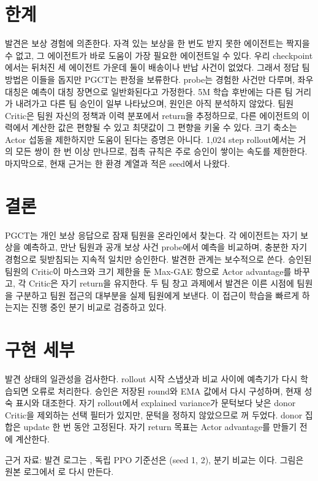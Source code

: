 \documentclass[10pt,twocolumn,letterpaper]{article}
\begin{document}
\section{한계}
발견은 보상 경험에 의존한다. 자격 있는 보상을 한 번도 받지 못한 에이전트는 짝지을 수 없고, 그 에이전트가 바로 도움이 가장 필요한 에이전트일 수 있다. 우리 checkpoint에서는 뒤처진 세 에이전트 가운데 둘이 배송이나 반납 사건이 없었다. 그래서 정답 팀 방법은 이들을 돕지만 PGCT는 판정을 보류한다. probe는 경험한 사건만 다루며, 좌우 대칭은 예측이 대칭 장면으로 일반화된다고 가정한다. 5M 학습 후반에는 다른 팀 거리가 내려가고 다른 팀 승인이 일부 나타났으며, 원인은 아직 분석하지 않았다. 팀원 Critic은 팀원 자신의 정책과 이력 분포에서 return을 추정하므로, 다른 에이전트의 이력에서 계산한 값은 편향될 수 있고 최댓값이 그 편향을 키울 수 있다. 크기 축소는 Actor 섭동을 제한하지만 도움이 된다는 증명은 아니다. 1{,}024 step rollout에서는 거의 모든 쌍이 한 번 이상 만나므로, 접촉 규칙은 주로 승인이 쌓이는 속도를 제한한다. 마지막으로, 현재 근거는 한 환경 계열과 적은 seed에서 나왔다.

\section{결론}
PGCT는 개인 보상 응답으로 잠재 팀원을 온라인에서 찾는다. 각 에이전트는 자기 보상을 예측하고, 만난 팀원과 공개 보상 사건 probe에서 예측을 비교하며, 충분한 자기 경험으로 뒷받침되는 지속적 일치만 승인한다. 발견한 관계는 보수적으로 쓴다. 승인된 팀원의 Critic이 마스크와 크기 제한을 둔 Max-GAE 항으로 Actor advantage를 바꾸고, 각 Critic은 자기 return을 유지한다. 두 팀 창고 과제에서 발견은 이른 시점에 팀원을 구분하고 팀원 접근의 대부분을 실제 팀원에게 보낸다. 이 접근이 학습을 빠르게 하는지는 진행 중인 분기 비교로 검증하고 있다.




\appendix
\section{구현 세부}
발견 상태의 일관성을 검사한다. rollout 시작 스냅샷과 비교 사이에 예측기가 다시 학습되면 오류로 처리한다. 승인은 저장된 round와 EMA 값에서 다시 구성하며, 현재 성숙 표시와 대조한다. 자기 rollout에서 explained variance가 문턱보다 낮은 donor Critic을 제외하는 선택 필터가 있지만, 문턱을 정하지 않았으므로 꺼 두었다. donor 집합은 update 한 번 동안 고정된다. 자기 return 목표는 Actor advantage를 만들기 전에 계산한다.

근거 자료: 발견 로그는 , 독립 PPO 기준선은 (seed 1, 2), 분기 비교는 이다. 그림은 원본 로그에서 로 다시 만든다.
\end{document}
